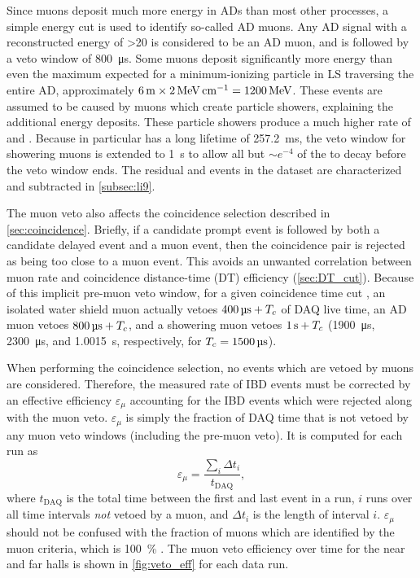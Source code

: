 Since muons deposit much more energy in ADs than most other processes,
a simple energy cut is used to identify so-called AD muons.
Any AD signal with a reconstructed energy of \SI{>20}{\mev}
is considered to be an AD muon, and is followed by a veto window
of \SI{800}{\micro\second}.
Some muons deposit significantly more energy than
even the maximum expected for a minimum-ionizing particle in LS
traversing the entire AD, approximately
$\SI{6}{\meter}\times\SI{2}{\mev\per\cm}=\SI{1200}{\mev}$.
These events are assumed to be caused by muons which create particle showers,
explaining the additional energy deposits.
These particle showers produce a much higher rate of
\li and \he.
Because \li{} in particular has a long lifetime of \SI{257.2}{\milli\second},
the veto window for showering muons is extended to \SI{1}{\second}
to allow all but $\sim e^{-4}$ of the \li{} to decay before the veto window ends.
The residual \li and \he events in the dataset are characterized
and subtracted in \cref{subsec:li9}.

The muon veto also affects the coincidence selection
described in \cref{sec:coincidence}.
Briefly, if a candidate prompt event is followed
by both a candidate delayed event and a muon event,
then the coincidence pair is rejected as being too close to a muon event.
This avoids an unwanted correlation between muon rate
and coincidence distance-time (DT) efficiency (\cref{sec:DT_cut}).
Because of this implicit pre-muon veto window,
for a given coincidence time cut \tc,
an isolated water shield muon actually vetoes $\SI{400}{\micro\second}+T_c$
of DAQ live time,
an AD muon vetoes $\SI{800}{\micro\second}+T_c$,
and a showering muon vetoes $\SI{1}{\second}+T_c$
(\SI{1900}{\us}, \SI{2300}{\us}, and \SI{1.0015}{\s}, respectively,
for $\tc=\SI{1500}{\us}$).

When performing the coincidence selection, no events which are vetoed by muons
are considered.
Therefore, the measured rate of IBD events
must be corrected by an effective efficiency $\varepsilon_\mu$
accounting for the IBD events which were rejected along with the muon veto.
$\varepsilon_\mu$ is simply the fraction of DAQ time
that is not vetoed by any muon veto windows (including the pre-muon veto).
It is computed for each run as
\begin{equation}
    \varepsilon_\mu = \frac{\sum_i \Delta t_i}{t_{\text{DAQ}}},
\end{equation}
where $t_{\text{DAQ}}$ is the total time
between the first and last event in a run,
$i$ runs over all time intervals \textit{not} vetoed by a muon,
and $\Delta t_i$ is the length of interval $i$.
$\varepsilon_\mu$ should not be confused
with the fraction of muons which are identified by the muon criteria,
which is \SI{100}{\percent} \cite{muonsystem2015}.
The muon veto efficiency over time for the near and far halls
is shown in \cref{fig:veto_eff} for each data run.

